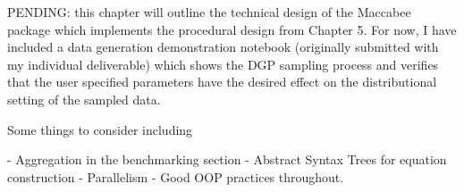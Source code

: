 \documentclass[../main.tex]{subfiles}
\begin{document}
PENDING: this chapter will outline the technical design of the Maccabee package which implements the procedural design from Chapter 5. For now, I have included a data generation demonstration notebook (originally submitted with my individual deliverable) which shows the DGP sampling process and verifies that the user specified parameters have the desired effect on the distributional setting of the sampled data.

Some things to consider including

- Aggregation in the benchmarking section
- Abstract Syntax Trees for equation construction
- Parallelism
- Good OOP practices throughout.
\end{document}
